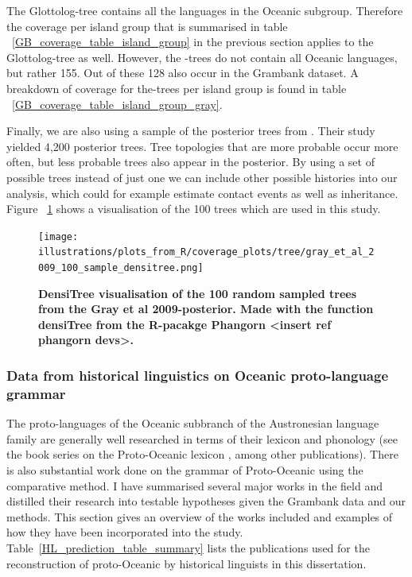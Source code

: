 \documentclass[a4paper,10pt]{article} %
\begin{document}
The Glottolog-tree contains all the languages in the Oceanic subgroup. Therefore the coverage per island group that is summarised in table ~\ref{GB_coverage_table_island_group} in the previous section applies to the Glottolog-tree as well. However, the \cite{grayetal_2009}-trees do not contain all Oceanic languages, but rather 155. Out of these 128 also occur in the Grambank dataset. A breakdown of coverage for the\cite{grayetal_2009}-trees per island group is found in table ~\ref{GB_coverage_table_island_group_gray}.

Finally, we are also using a sample of the posterior trees from \cite{grayetal_2009}. Their study yielded 4,200 posterior trees. Tree topologies that are more probable occur more often, but less probable trees also appear in the posterior. By using a set of possible trees instead of just one we can include other possible histories into our analysis, which could for example estimate contact events as well as inheritance. Figure ~\ref{densitree_plot} shows a visualisation of the 100 trees which are used in this study.

\begin{figure}[H]
\centering
\texttt{[image: illustrations/plots\_from\_R/coverage\_plots/tree/gray\_et\_al\_2009\_100\_sample\_densitree.png]}
\caption{\textbf{DensiTree \citep{bouckaert2014densitree} visualisation of the 100 random sampled trees from the Gray et al 2009-posterior. Made with the function densiTree from the R-pacakge Phangorn <insert ref phangorn devs>.}}
\label{densitree_plot}
\end{figure}

\subsubsection{Data from historical linguistics on Oceanic proto-language grammar}
\label{sec:POC_lit_review}

The proto-languages of the Oceanic subbranch of the Austronesian language family are generally well researched in terms of their lexicon and phonology (see the book series on the Proto-Oceanic lexicon \citep{protooceanicvol1, protooceanicvol2, protooceanicvol3, protooceanicvol4, protooceanicvol5}, among other publications). There is also substantial work done on the grammar of Proto-Oceanic using the comparative method. I have summarised several major works in the field and distilled their research into testable hypotheses given the Grambank data and our methods. This section gives an overview of the works included and examples of how they have been incorporated into the study. Table~\ref{HL_prediction_table_summary} lists the publications used for the reconstruction of proto-Oceanic by historical linguists in this dissertation. 
\end{document}
